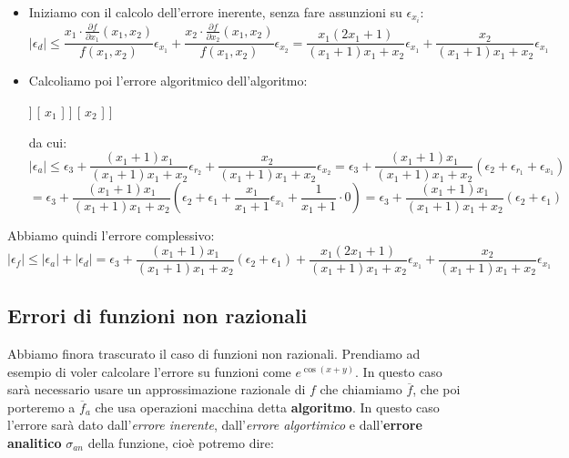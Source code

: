 \documentclass[a4paper,11pt]{article}
\begin{document}
\begin{itemize}
	\item Iniziamo con il calcolo dell'errore inerente, senza fare assunzioni su $\epsilon_{x_i}$:
		$$
		|\epsilon_d| \leq \frac{ x_1 \cdot \frac{\partial f}{\partial x_1}(x_1, x_2)}{f(x_1, x_2)} \epsilon_{x_1} + \frac{ x_2 \cdot \frac{\partial f}{\partial x_2}(x_1, x_2)}{f(x_1, x_2)} \epsilon_{x_2}
		= \frac{x_1(2x_1 + 1)}{(x_1 + 1)x_1 + x_2} \epsilon_{x_1} + \frac{x_2}{(x_1 + 1)x_1 + x_2} \epsilon_{x_1}
		$$
	\item Calcoliamo poi l'errore algoritmico dell'algoritmo:
		\begin{center}
			\begin{forest}
				[
					{$r_3 = r_2 + x_2$}
					[
						{$r_2 = r_1 x_1$}
						[
							{$r_1 = x_1 + 1$}	
							[
								{$x_1$}
							]
							[
								{$1$}
							]
						]
						[
							{$x_1$}
						]
					]	
					[
						{$x_2$}
					]	
				]	
			\end{forest}
		\end{center}
		da cui:
		$$
		|\epsilon_a| \leq \epsilon_3 + \frac{(x_1 + 1) x_1}{(x_1 + 1)x_1 + x_2} \epsilon_{r_2} + \frac{x_2}{(x_1 + 1)x_1 + x_2} \epsilon_{x_2}
		= \epsilon_3 + \frac{(x_1 + 1) x_1}{(x_1 + 1)x_1 + x_2} (\epsilon_2 + \epsilon_{r_1} + \epsilon_{x_1})
		$$
		$$
		= \epsilon_3 + \frac{(x_1 + 1) x_1}{(x_1 + 1)x_1 + x_2} (\epsilon_2 + \epsilon_1 + \frac{x_1}{x_1 + 1} \epsilon_{x_1} + \frac{1}{x_1 + 1} \cdot 0) = \epsilon_3 + \frac{(x_1 + 1) x_1}{(x_1 + 1) x_1 + x_2}	(\epsilon_2 + \epsilon_1)
		$$
\end{itemize}

Abbiamo quindi l'errore complessivo:
$$
|\epsilon_f| \leq |\epsilon_a| + |\epsilon_d| = \epsilon_3 + \frac{(x_1 + 1) x_1}{(x_1 + 1) x_1 + x_2}	(\epsilon_2 + \epsilon_1) + \frac{x_1(2x_1 + 1)}{(x_1 + 1)x_1 + x_2} \epsilon_{x_1} + \frac{x_2}{(x_1 + 1)x_1 + x_2} \epsilon_{x_1}
$$

\subsection{Errori di funzioni non razionali}
Abbiamo finora trascurato il caso di funzioni non razionali.
Prendiamo ad esempio di voler calcolare l'errore su funzioni come $e^{\cos(x + y)}$.
In questo caso sarà necessario usare un approssimazione razionale di $f$ che chiamiamo $\overline{f}$, che poi porteremo a $\overline{f}_a$ che usa operazioni macchina detta \textbf{algoritmo}.
In questo caso l'errore sarà dato dall'\textit{errore inerente}, dall'\textit{errore algortimico} e dall'\textbf{errore analitico} $\sigma_{an}$ della funzione, cioè potremo dire:
\end{document}
